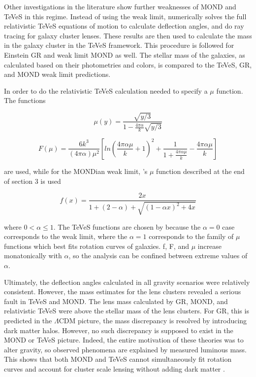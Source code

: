 \documentclass[12pt]{article}
\begin{document}
Other investigations in the literature show further weaknesses of MOND and TeVeS in this regime. Instead of using the weak limit, \cite{Mavromatos} numerically solves the full relativistic TeVeS equations of motion to calculate deflection angles, and do ray tracing for galaxy cluster lenses. These results are then used to calculate the mass in the galaxy cluster in the TeVeS framework. This procedure is followed for Einstein GR and weak limit MOND as well. The stellar mass of the galaxies, as calculated based on their photometries and colors, is compared to the TeVeS, GR, and MOND weak limit predictions.

In order to do the relativistic TeVeS calculation \cite{Mavromatos} needed to specify a $\mu$ function. The functions 

$$\mu(y) = \frac{\sqrt{y/3}}{1 - \frac{4\pi \alpha}{k} \sqrt{y/3}} $$
 
$$F(\mu) = \frac{6k^{3}}{(4\pi \alpha)\mu^{2}} [ln(\frac{4\pi \alpha \mu}{k} + 1)^{2} + \frac{1}{1 + \frac{4\pi \alpha \mu}{k}} - \frac{4\pi \alpha \mu}{k}]$$

are used, while for the MONDian weak limit, \cite{Bekenstein2004}'s $\mu$ function described at the end of section 3 is used

$$f(x)  = \frac{2x}{1 + (2 - \alpha) + \sqrt{(1 - \alpha x)^{2} + 4x}}$$

where $0 < \alpha \leq 1$. The TeVeS functions are chosen by \cite{Mavromatos} because the $\alpha = 0$ case corresponds to the weak limit, where the $\alpha = 1$ corresponds to the family of $\mu$ functions which best fits rotation curves of galaxies. f, F, and $\mu$ increase monatonically with $\alpha$, so the analysis can be confined between extreme values of $\alpha$.

Ultimately, the deflection angles calculated in all gravity scenarios were relatively consistent. However, the mass estimates for the lens clusters revealed a serious fault in TeVeS and MOND. The lens mass calculated by GR, MOND, and relativistic TeVeS were above the stellar mass of the lens clusters. For GR, this is predicted in the $\Lambda$CDM picture, the mass discrepancy is resolved by introducing dark matter halos. However, no such discrepancy is supposed to exist in the MOND or TeVeS picture. Indeed, the entire motivation of these theories was to alter gravity, so observed phenomena are explained by measured luminous mass. This shows that both MOND and TeVeS cannot simultaneously fit rotation curves and account for cluster scale lensing without adding dark matter \cite{Mavromatos}.
\end{document}
